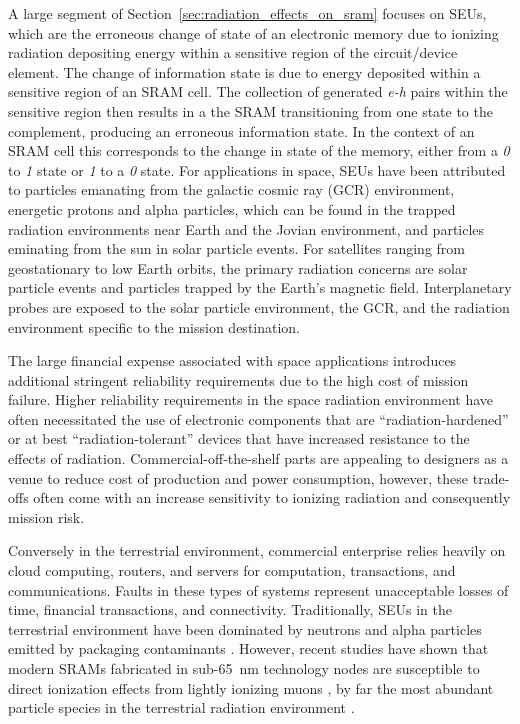 A large segment of Section~\ref{sec:radiation_effects_on_sram} focuses on SEUs, which are the erroneous change of state of an electronic memory due to ionizing radiation depositing energy within a sensitive region of the circuit/device element. 
The change of information state is due to energy deposited within a sensitive region of an SRAM cell.
The collection of generated \emph{e-h} pairs within the sensitive region then results in a the SRAM transitioning from one state to the complement, producing an erroneous information state.
In the context of an SRAM cell this corresponds to the change in state of the memory, either from a \emph{0} to \emph{1} state or \emph{1} to a \emph{0} state.
For applications in space, SEUs have been attributed to particles emanating from the galactic cosmic ray (GCR) environment, energetic protons and alpha particles, which can be found in the trapped radiation environments near Earth and the Jovian environment, and particles eminating from the sun in solar particle events.
For satellites ranging from geostationary to low Earth orbits, the primary radiation concerns are solar particle events and particles trapped by the Earth's magnetic field.
Interplanetary probes are exposed to the solar particle environment, the GCR, and the radiation environment specific to the mission destination.

The large financial expense associated with space applications introduces additional stringent reliability requirements due to the high cost of mission failure.
Higher reliability requirements in the space radiation environment have often necessitated the use of electronic components that are ``radiation-hardened'' or at best ``radiation-tolerant'' devices that have increased resistance to the effects of radiation.
Commercial-off-the-shelf parts are appealing to designers as a venue to reduce cost of production and power consumption, however, these trade-offs often come with an increase sensitivity to ionizing radiation and consequently mission risk.

Conversely in the terrestrial environment, commercial enterprise relies heavily on cloud computing, routers, and servers for computation, transactions, and communications. 
Faults in these types of systems represent unacceptable losses of time, financial transactions, and connectivity. 
Traditionally, SEUs in the terrestrial environment have been dominated by neutrons and alpha particles emitted by packaging contaminants \cite{Tang:2007vi,Tang:2009ji,Sierawski:2010cj,Sierawski:2011tc}.
However, recent studies have shown that modern SRAMs fabricated in sub-65~nm technology nodes are susceptible to direct ionization effects from lightly ionizing muons \cite{Sierawski:2010cj,Sierawski:2011bn,Sierawski:2011tc}, by far the most abundant particle species in the terrestrial radiation environment \cite{Wallmark:1962vn,Sierawski:2010cj,grieder2001cosmic}.

